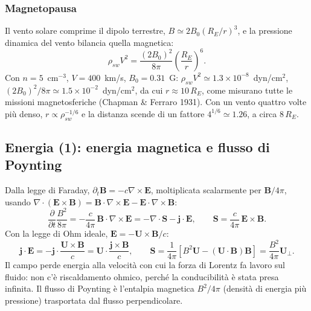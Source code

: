 \subsubsection*{Magnetopausa}
Il vento solare comprime il dipolo terrestre, $B\simeq2B_0(R_E/r)^3$, e la pressione dinamica del vento bilancia quella magnetica:
\begin{equation}
\rho_{sw}V^2=\frac{(2B_0)^2}{8\pi}\left(\frac{R_E}{r}\right)^6 .
\end{equation}
Con $n=5$~cm$^{-3}$, $V=400$~km/s, $B_0=0.31$~G: $\rho_{sw}V^2\simeq1.3\times10^{-8}$~dyn/cm$^2$, $(2B_0)^2/8\pi\simeq1.5\times10^{-2}$~dyn/cm$^2$, da cui $r\approx10\,R_E$, come misurano tutte le missioni magnetosferiche (Chapman \& Ferraro 1931). Con un vento quattro volte più denso, $r\propto\rho_{sw}^{-1/6}$ e la distanza scende di un fattore $4^{1/6}\simeq1.26$, a circa $8\,R_E$.

\subsection{Energia (1): energia magnetica e flusso di Poynting}
Dalla legge di Faraday, $\partial_t\mathbf{B}=-c\nabla\times\mathbf{E}$, moltiplicata scalarmente per $\mathbf{B}/4\pi$, usando $\nabla\cdot(\mathbf{E}\times\mathbf{B})=\mathbf{B}\cdot\nabla\times\mathbf{E}-\mathbf{E}\cdot\nabla\times\mathbf{B}$:
\begin{equation}
\frac{\partial}{\partial t}\frac{B^2}{8\pi}=-\frac{c}{4\pi}\,\mathbf{B}\cdot\nabla\times\mathbf{E}=-\nabla\cdot\mathbf{S}-\mathbf{j}\cdot\mathbf{E},\qquad\mathbf{S}=\frac{c}{4\pi}\,\mathbf{E}\times\mathbf{B}.
\end{equation}
Con la legge di Ohm ideale, $\mathbf{E}=-\mathbf{U}\times\mathbf{B}/c$:
\begin{equation}
\mathbf{j}\cdot\mathbf{E}=-\mathbf{j}\cdot\frac{\mathbf{U}\times\mathbf{B}}{c}=\mathbf{U}\cdot\frac{\mathbf{j}\times\mathbf{B}}{c},\qquad\mathbf{S}=\frac{1}{4\pi}\left[B^2\mathbf{U}-(\mathbf{U}\cdot\mathbf{B})\mathbf{B}\right]=\frac{B^2}{4\pi}\mathbf{U}_\perp .
\end{equation}
Il campo perde energia alla velocità con cui la forza di Lorentz fa lavoro sul fluido: non c'è riscaldamento ohmico, perché la conducibilità è stata presa infinita. Il flusso di Poynting è l'entalpia magnetica $B^2/4\pi$ (densità di energia più pressione) trasportata dal flusso perpendicolare.

